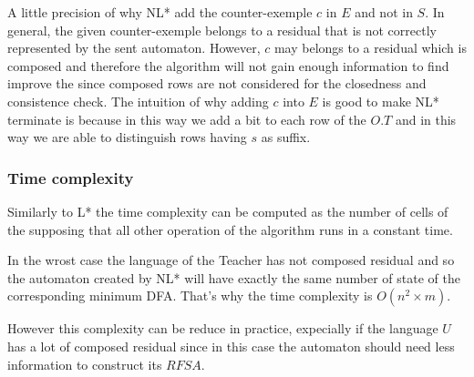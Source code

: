 A little precision of why NL* add the counter-exemple $c$ in $E$ and not in $S$. In general, the given counter-exemple belongs to a residual that is not correctly represented by the sent automaton. However, $c$ may belongs to a residual which is composed and therefore the algorithm will not gain enough information to find improve the \OT since composed rows are not considered for the closedness and consistence check. The intuition of why adding $c$ into $E$ is good to make NL* terminate is because in this way we add a bit to each row of the $O.T$ and in this way we are able to distinguish rows having $s$ as suffix.


\subsubsection{Time complexity}
Similarly to L* the time complexity can be computed as the number of cells of the \OT supposing that all other operation of the algorithm runs in a constant time.

In the wrost case the language of the Teacher has not composed residual and so the automaton created by NL* will have exactly the same number of state of the corresponding minimum DFA. That's why the time complexity is $O(n^2 \times m)$.

However this complexity can be reduce in practice, expecially if the language $U$ has a lot of composed residual since in this case the automaton should need less information to construct its $RFSA$.